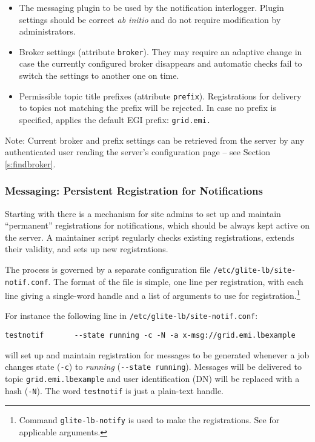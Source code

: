 \begin{itemize}
\item The messaging plugin to be used by the notification interlogger. Plugin settings should be correct \emph{ab initio} and do not require modification by administrators.
\item Broker settings (attribute \texttt{broker}). They may require an adaptive change in case the currently configured broker disappears and automatic checks fail to switch the settings to another one on time.
\item Permissible topic title prefixes (attribute \texttt{prefix}). Registrations for delivery to topics not matching the prefix will be rejected. In case no prefix is specified, \LB applies the default EGI prefix: \texttt{grid.emi.}
\end{itemize}
Note: Current broker and prefix settings can be retrieved from the \LB server by any authenticated user reading the server's configuration page -- see Section \ref{s:findbroker}.


\subsubsection{Messaging: Persistent Registration for Notifications}
\label{inst:sitenotif}

Starting with  there is a mechanism for site admins to set up and maintain ``permanent'' registrations for notifications, which should be always kept active on the server. A maintainer script regularly checks existing registrations, extends their validity, and sets up new registrations.

The process is governed by a separate configuration file \texttt{/etc/glite-lb/site-notif.conf}. The format of the file is simple, one line per registration, with each line giving a single-word handle and a list of arguments to use for registration.\footnote{Command \texttt{glite-lb-notify} is used to make the registrations. See \cite{lbug} for applicable arguments.}

For instance the following line in \texttt{/etc/glite-lb/site-notif.conf}:

\begin{verbatim}
testnotif       --state running -c -N -a x-msg://grid.emi.lbexample
\end{verbatim}

\indent{}will set up and maintain registration for messages to be generated whenever a job changes state (\texttt{-c}) to \emph{running} (\texttt{-{}-state running}). Messages will be delivered to topic \texttt{grid.emi.lbexample} and user identification (DN) will be replaced with a hash (\texttt{-N}). The word \texttt{testnotif} is just a plain-text handle.

